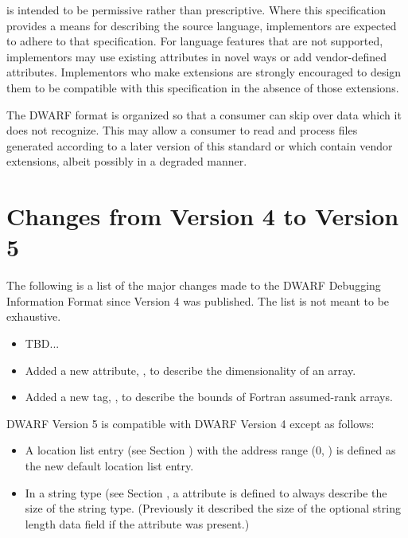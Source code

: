  is intended to be permissive rather than
prescriptive. 
Where this specification provides a means for
describing the source language, implementors are expected
to adhere to that specification. 
For language features that
are not supported, implementors may use existing attributes
in novel ways or add vendor-defined attributes. 
Implementors
who make extensions are strongly encouraged to design them
to be compatible with this specification in the absence of
those extensions.

The DWARF format is organized so that a consumer can skip over
data which it does not recognize. 
This may allow a consumer
to read and process files generated according to a later
version of this standard or which contain vendor extensions,
albeit possibly in a degraded manner.

\section{Changes from Version 4 to Version 5}
The following is a list of the major changes made to the DWARF Debugging Information
Format since Version 4 was published. The list is not meant to be exhaustive.
\begin{itemize}
\item TBD...
\item Added a new attribute, \DWATrank{}, to describe the dimensionality of
an array.
\item Added a new tag, \DWTAGgenericsubrange{}, to describe the
bounds of Fortran assumed-rank arrays.

\end{itemize}

DWARF Version 5 is compatible with DWARF Version 4 except as follows:
\begin{itemize}
\item A location list entry (see Section ) with 
the address range (0, ) is defined as the new default location 
list entry.
\item In a string type (see Section , a \DWATbytesize{}
attribute is defined to always describe the size of the string type. (Previously
it described the size of the optional string length data field if the \DWATstringlength{}
attribute was present.)
\end{itemize}

